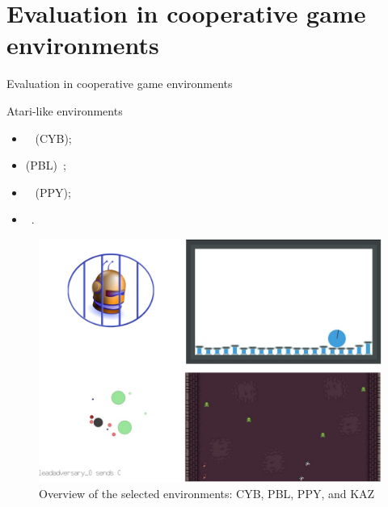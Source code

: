 \AtBeginSection[]{
    \begin{frame}
        \frametitle{}
        \tableofcontents[currentsection]
    \end{frame}
}


\section{Evaluation in cooperative game environments}

\begin{frame}{Evaluation in cooperative game environments}

    \begin{block}{Atari-like environments}

        \begin{minipage}{0.5\textwidth}
            \centering
            \begin{itemize}
                \item {}~\cite{cage_challenge_3_announcement} (CYB);
                \item {} (PBL)~\cite{Terry2021};
                \item {}~\cite{Lowe2017} (PPY);
                \item {}~\cite{Terry2021}.
            \end{itemize}
        \end{minipage}\hfill
        \begin{minipage}{0.5\textwidth}
            \centering
            \begin{figure}[H]
                \centering
                \includegraphics[width=0.5\linewidth]{figures/envs_4x4.png}
                \caption{Overview of the selected environments: CYB, PBL, PPY, and KAZ}
                \label{fig:simulated_environments}
            \end{figure}
        \end{minipage}\hfill


\end{block}
\end{frame}
